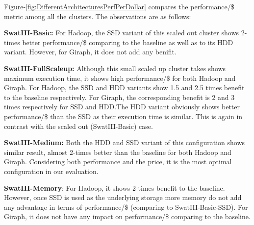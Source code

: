 \documentclass[10pt, conference, compsocconf]{IEEEtran}
\begin{document}
Figure-\ref{fig:DifferentArchitecturesPerfPerDollar} compares the performance/\$ metric among all the clusters. The observations are as follows:
\begin{inparaenum}[\itshape 1\upshape)]
\item \textbf{SwatIII-Basic:} For Hadoop, the SSD variant of this scaled out cluster shows 2-times better performance/\$ comparing to the baseline as well as to its HDD variant. However, for Giraph, it does not add any benifit.
\item \textbf{SwatIII-FullScaleup:} Although this small scaled up cluster takes shows maximum execution time, it shows high performance/\$ for both Hadoop and Giraph. For Hadoop, the SSD and HDD variants show 1.5 and 2.5 times benefit to the baseline respectively. For Giraph, the corresponding benefit is 2 and 3 times respectively for SSD and HDD.The HDD variant obviously shows better performance/\$ than the SSD as their execution time is similar. This is again in contrast with the scaled out (SwatIII-Basic) case.
\item \textbf{SwatIII-Medium:} Both the HDD and SSD variant of this configuration shows similar result, almost 2-times better than the baseline for both Hadoop and Giraph. Considering both performance and the price, it is the most optimal configuration in our evaluation.
\item \textbf{SwatIII-Memory}: For Hadoop, it shows 2-times benefit to the baseline. However, once SSD is used as the underlying storage more memory do not add any advantage in terms of performance/\$ (comparing to SwatIII-Basic-SSD). For Giraph, it does not have any impact on performance/\$ comparing to the baseline. 
\end{inparaenum}
\end{document}
